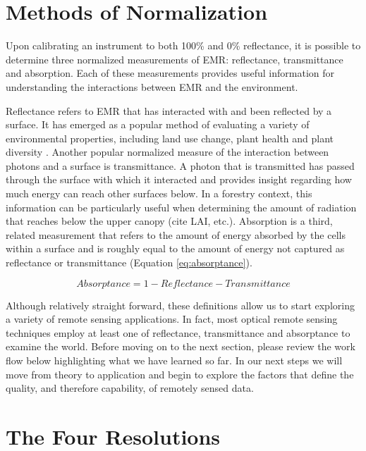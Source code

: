 \documentclass[
]{book}
\begin{document}
\section{Methods of Normalization}\label{methods-of-normalization}

Upon calibrating an instrument to both 100\% and 0\% reflectance, it is possible to determine three normalized measurements of EMR: reflectance, transmittance and absorption. Each of these measurements provides useful information for understanding the interactions between EMR and the environment.

Reflectance refers to EMR that has interacted with and been reflected by a surface. It has emerged as a popular method of evaluating a variety of environmental properties, including land use change, plant health and plant diversity \citep{asner_spectroscopy_2011}. Another popular normalized measure of the interaction between photons and a surface is transmittance. A photon that is transmitted has passed through the surface with which it interacted and provides insight regarding how much energy can reach other surfaces below. In a forestry context, this information can be particularly useful when determining the amount of radiation that reaches below the upper canopy (cite LAI, etc.). Absorption is a third, related measurement that refers to the amount of energy absorbed by the cells within a surface and is roughly equal to the amount of energy not captured as reflectance or transmittance (Equation \eqref{eq:absorptance}).

\begin{equation}
Absorptance = 1 - Reflectance - Transmittance 
\label{eq:absorptance}
\end{equation}

Although relatively straight forward, these definitions allow us to start exploring a variety of remote sensing applications. In fact, most optical remote sensing techniques employ at least one of reflectance, transmittance and absorptance to examine the world. Before moving on to the next section, please review the work flow below highlighting what we have learned so far. In our next steps we will move from theory to application and begin to explore the factors that define the quality, and therefore capability, of remotely sensed data.

\section{The Four Resolutions}\label{the-four-resolutions}
\end{document}
